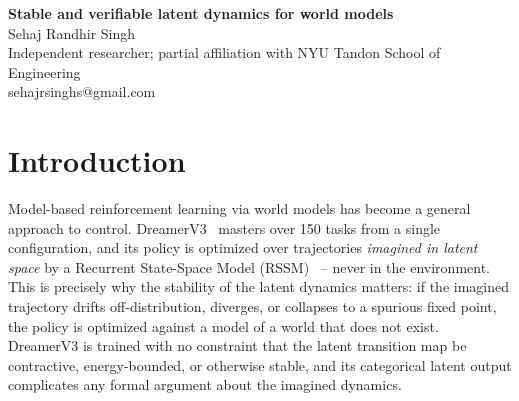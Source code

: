 \documentclass[11pt]{article}
\begin{document}
\begin{center}
{\LARGE\bfseries Stable and verifiable latent dynamics for world models}\\[0.6em]
{\large Sehaj Randhir Singh}\\[0.2em]
{\normalsize Independent researcher; partial affiliation with NYU Tandon School
of Engineering}\\[0.2em]
{\small sehajrsinghs@gmail.com}
\end{center}

\begin{abstract}
\noindent
World models of the Dreamer family optimize policies over latent trajectories
imagined by a recurrent state-space model, yet nothing in their training
constrains those latent dynamics to be stable, and the categorical latent
output blocks direct formal certification. We report two measured obstacles
and an evaluation standard for the resulting problem. First, a
sampling-to-proof gap audit of the one-step latent map under a frozen actor:
a Lyapunov decrease condition, a large random-sampling baseline, and
branch-and-bound verification with a reachability gate. Second, a measured
verifier wall: interval bound propagation asserts on the categorical output
at any useful width, so every branch-and-bound box is recorded as
\emph{unknown} with its reason, never as a violation. Third, a five-mode
failure atlas from a controlled latent-space study shows why naive stability
constraints fail, from which we derive design rules and an
aliveness-gated evaluation standard. All claims name the object, region, and
condition that produced them.
\end{abstract}

\section{Introduction}

Model-based reinforcement learning via world models has become a general
approach to control. DreamerV3~\cite{hafner2025nature,hafner2023arxiv}
masters over 150 tasks from a single configuration, and its policy is
optimized over trajectories \emph{imagined in latent space} by a Recurrent
State-Space Model (RSSM)~\cite{hafner2019icml} -- never in the environment.
This is precisely why the stability of the latent dynamics matters: if the
imagined trajectory drifts off-distribution, diverges, or collapses to a
spurious fixed point, the policy is optimized against a model of a world
that does not exist. DreamerV3 is trained with no constraint that the latent
transition map be contractive, energy-bounded, or otherwise stable, and its
categorical latent output complicates any formal argument about the imagined
dynamics.
\end{document}
